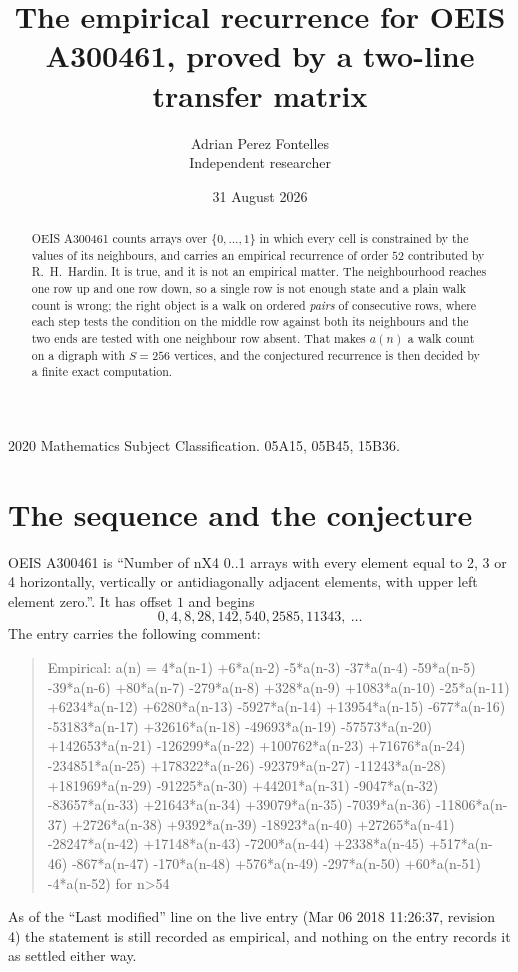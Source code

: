 \documentclass[11pt,a4paper]{article}
\title{The empirical recurrence for OEIS A300461, proved by a two-line transfer matrix}
\author{Adrian Perez Fontelles\\ \small Independent researcher}
\date{31 August 2026}
\theoremstyle{plain}
\theoremstyle{definition}
\begin{document}
\maketitle

\begin{abstract}
OEIS A300461 counts arrays over $\{0,\dots,1\}$ in which every cell is constrained by the
values of its neighbours, and carries an empirical recurrence of order $52$ contributed
by R.~H.~Hardin. It is true, and it is not an empirical matter. The neighbourhood reaches one
row up and one row down, so a single row is not enough state and a plain walk count
is wrong; the right object is a walk on ordered \emph{pairs} of consecutive rows, where
each step tests the condition on the middle row against both its neighbours and the two
ends are tested with one neighbour row absent. That makes $a(n)$ a walk count on a digraph
with $S=256$ vertices, and the conjectured recurrence is then decided by a finite exact
computation.
\end{abstract}

\noindent\small 2020 Mathematics Subject Classification. 05A15, 05B45, 15B36.\normalsize

\section{The sequence and the conjecture}

OEIS A300461 is ``Number of nX4 0..1 arrays with every element equal to 2, 3 or 4 horizontally, vertically or antidiagonally adjacent elements, with upper left element zero.''. It has offset $1$ and begins
\[
0, 4, 8, 28, 142, 540, 2585, 11343,\ \dots
\]
The entry carries the following comment:
\begin{quote}\small
Empirical: a(n) = 4*a(n-1) +6*a(n-2) -5*a(n-3) -37*a(n-4) -59*a(n-5) -39*a(n-6) +80*a(n-7) -279*a(n-8) +328*a(n-9) +1083*a(n-10) -25*a(n-11) +6234*a(n-12) +6280*a(n-13) -5927*a(n-14) +13954*a(n-15) -677*a(n-16) -53183*a(n-17) +32616*a(n-18) -49693*a(n-19) -57573*a(n-20) +142653*a(n-21) -126299*a(n-22) +100762*a(n-23) +71676*a(n-24) -234851*a(n-25) +178322*a(n-26) -92379*a(n-27) -11243*a(n-28) +181969*a(n-29) -91225*a(n-30) +44201*a(n-31) -9047*a(n-32) -83657*a(n-33) +21643*a(n-34) +39079*a(n-35) -7039*a(n-36) -11806*a(n-37) +2726*a(n-38) +9392*a(n-39) -18923*a(n-40) +27265*a(n-41) -28247*a(n-42) +17148*a(n-43) -7200*a(n-44) +2338*a(n-45) +517*a(n-46) -867*a(n-47) -170*a(n-48) +576*a(n-49) -297*a(n-50) +60*a(n-51) -4*a(n-52) for n>54
\end{quote}
As of the ``Last modified'' line on the live entry (Mar 06 2018 11:26:37, revision 4) the statement is
still recorded as empirical, and nothing on the entry records it as settled either way.
\end{document}
